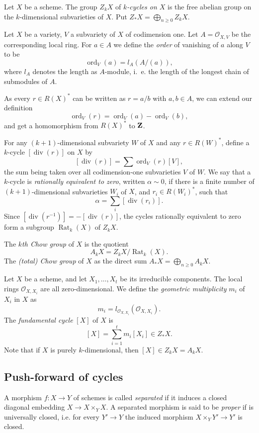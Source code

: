 \documentclass[a4paper,openany]{scrbook}
\DeclareMathOperator{\Rat}{Rat}
\DeclareMathOperator{\ord}{ord}
\DeclareMathOperator{\divisor}{div}
\begin{document}
Let $X$ be a scheme. The group $Z_kX$ of \emph{$k$-cycles on $X$} is the free abelian group on the $k$-dimensional subvarieties of $X$. Put $Z_*X=\bigoplus_{n\geq 0} Z_kX$.

Let $X$ be a variety, $V$ a subvariety of $X$ of codimension one. Let $A=\mathcal O_{X,V}$ be the corresponding local ring. For $a\in A$ we define the \emph{order} of vanishing of $a$ along $V$ to be
\[
\ord_V(a)=l_A(A/(a)),
\]
where $l_A$ denotes the length as $A$-module, i.~e. the length of the longest chain of submodules of $A$.

As every $r\in R(X)^*$ can be written as $r=a/b$ with $a,b\in A$, we can extend our definition
\[\ord_V(r)=\ord_V(a)-\ord_V(b),\]
and get a homomorphism from $R(X)^*$ to $\mathbf Z$.

For any $(k+1)$-dimensional subvariety $W$ of $X$ and any $r\in R(W)^*$, define a $k$-cycle $[\divisor(r)]$ on $X$ by
\[
[\divisor(r)]=\sum \ord_V(r)[V],
\]
the sum being taken over all codimension-one subvarieties $V$ of $W$. We say that a $k$-cycle is \emph{rationally equivalent to zero}, written $\alpha \sim 0$, if there is a finite number of $(k+1)$-dimensional subvarieties $W_i$ of $X$, and $r_i\in R(W_i)^*$, such that
\[\alpha = \sum_i[\divisor(r_i)].\]
Since $[\divisor(r^{-1})]=-[\divisor(r)]$, the cycles rationally equivalent to zero form a subgroup $\Rat_k(X)$ of $Z_kX$.

\begin{defn}
The \emph{$k$th Chow group} of $X$ is the quotient
\[
A_k X=Z_k X/\Rat_k(X).
\]
The \emph{(total) Chow group} of $X$ as the direct sum $A_*X=\bigoplus_{n\geq 0} A_kX$.
\end{defn}


Let $X$ be a scheme, and let $X_1,\ldots,X_t$ be its irreducible components. The local rings $\mathcal O_{X,X_i}$ are all zero-dimensional. We define the \emph{geometric multiplicity} $m_i$ of $X_i$ in $X$ as 
\[m_i=l_{\mathcal O_{X,X_i}}(\mathcal O_{X,X_i}).\]
The \emph{fundamental cycle} $[X]$ of $X$ is
\[[X]=\sum_{i=1}^t m_i[X_i] \in Z_*X.\]
Note that if $X$ is purely $k$-dimensional, then $[X]\in Z_kX=A_kX$.

\subsection{Push-forward of cycles}

A morphism $f\colon X\to Y$ of schemes is called \emph{separated} if it induces a closed diagonal embedding $X\to X\times_Y X$. A separated morphism is said to be \emph{proper} if is universally closed, i.e. for every $Y'\to Y$ the induced morphism $X\times_Y Y' \to Y'$ is closed.
\end{document}
